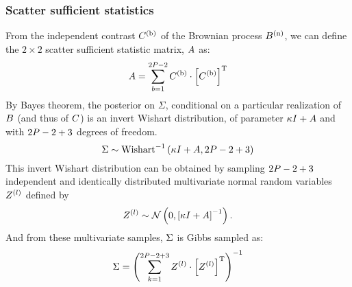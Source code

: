 \subsubsection{Scatter sufficient statistics}
From the independent contrast $C^{(\text{b})}$ of the Brownian process $B^{(\text{n})}$, we can define the $2 \times 2$ scatter sufficient statistic matrix, $A$ as:
\begin{equation}
    A = \sum\limits_{b=1}^{2 P - 2} C^{(\text{b})} \cdot \left[C^{(\text{b})}\right]^{\mathrm{T}}
\end{equation}
By Bayes theorem, the \gls{posterior} on $\Sigma$, conditional on a particular realization of $B$ (and thus of $C$) is an invert Wishart distribution, of parameter $\kappa I + A$ and with $2 P - 2 + 3$ degrees of freedom.
\begin{equation}
    \Sigma \sim \mathrm{Wishart}^{-1}\left( \kappa I + A, 2 P - 2 + 3\right)
\end{equation}
This invert Wishart distribution can be obtained by sampling $2 P - 2 + 3$ independent and identically distributed multivariate normal random variables $Z^{(l)}$ defined by
\begin{equation}
    Z^{(l)} \sim \mathcal{N} \left( 0, \left[\kappa I + A\right]^{-1} \right).
\end{equation}
And from these multivariate samples, $\Sigma$ is Gibbs sampled as:
\begin{equation}
    \Sigma = \left( \sum\limits_{k=1}^{2 P - 2 + 3} Z^{(l)} \cdot \left[Z^{(l)} \right] ^{\mathrm{T}} \right)^{-1}
\end{equation}
